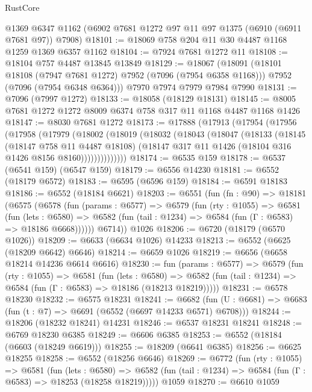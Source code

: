 \begin{lexlean}{RustCore}
\begin{coremodule}
    @1369
    @6347
    @1162
    (@6902 @7681 @1272 @97 @11 @97 @1375 (@6910 (@6911 @7681 @97)) @7908)
@18101 := @18069 @758 @204 @11 @30 @4487 @1168 @1259 @1369 @6357 @1162
@18104 := @7924 @7681 @1272 @11
@18108 := @18104 @757 @4487 @13845 @13849
@18129 := @18067
    (@18091
      (@18101 @18108 (@7947 @7681 @1272) @7952 (@7096 (@7954 @6358 @1168)))
      @7952
      (@7096 (@7954 @6348 @6364)))
    @7970
    @7974
    @7979
    @7984
    @7990
@18131 := @7096 (@7997 @1272)
@18133 := @18058 (@18129 @18131)
@18145 := @8005 @7681 @1272 @1272 @8009 @6374 @758 @317 @11 @1168 @4487 @1168 @1426
@18147 := @8030 @7681 @1272
@18173 := @17888
    (@17913
      (@17954
        (@17956
          (@17958
            (@17979
              (@18002
                (@18019
                  (@18032
                    (@18043
                      (@18047
                        (@18133
                          (@18145
                            (@18147 @758 @11 @4487 @18108)
                            (@18147 @317 @11 @1426 (@18104 @316 @1426 @8156 @8160))))))))))))))
@18174 := @6535 @159
@18178 := @6537 (@6541 @159) (@6547 @159)
@18179 := @6556 @14230
@18181 := @6552 (@18179 @6572)
@18183 := @6595 (@6596 @159)
@18184 := @6591 @18183
@18186 := @6552 (@18184 @6621)
@18203 := @6551
    (fun (fn : @90) =>
    @18181
      (@6575
        (@6578
          (fun (params : @6577) =>
          @6579
            (fun (rty : @1055) =>
            @6581
              (fun (lets : @6580) =>
              @6582 (fun (tail : @1234) => @6584 (fun (Γ : @6583) => @18186 @6668))))))
        @6714))
    @1026
@18206 := @6720 (@18179 (@6570 @1026))
@18209 := @6633 (@6634 @1026) @14233
@18213 := @6552 (@6625 (@18209 @6642) @6646)
@18214 := @6659 @1026
@18219 := @6656 (@6658 @18214 @14236 @6614 @6616)
@18230 := fun (params : @6577) =>
  @6579
    (fun (rty : @1055) =>
    @6581
      (fun (lets : @6580) =>
      @6582 (fun (tail : @1234) => @6584 (fun (Γ : @6583) => @18186 (@18213 @18219)))))
@18231 := @6578 @18230
@18232 := @6575 @18231
@18241 := @6682
    (fun (U : @6681) => @6683 (fun (t : @7) => @6691 (@6552 (@6697 @14233 @6571) @6708)))
@18244 := @18206 (@18232 @18241) @14231
@18246 := @6537 @18231 @18241
@18248 := @6769 @18230 @6385
@18249 := @6606 @6385
@18253 := @6552 (@18184 (@6603 (@18249 @6619)))
@18255 := @18209 (@6641 @6385)
@18256 := @6625 @18255
@18258 := @6552 (@18256 @6646)
@18269 := @6772
    (fun (rty : @1055) =>
    @6581
      (fun (lets : @6580) =>
      @6582 (fun (tail : @1234) => @6584 (fun (Γ : @6583) => @18253 (@18258 @18219)))))
    @1059
@18270 := @6610 @1059

\end{coremodule}
\end{lexlean}

